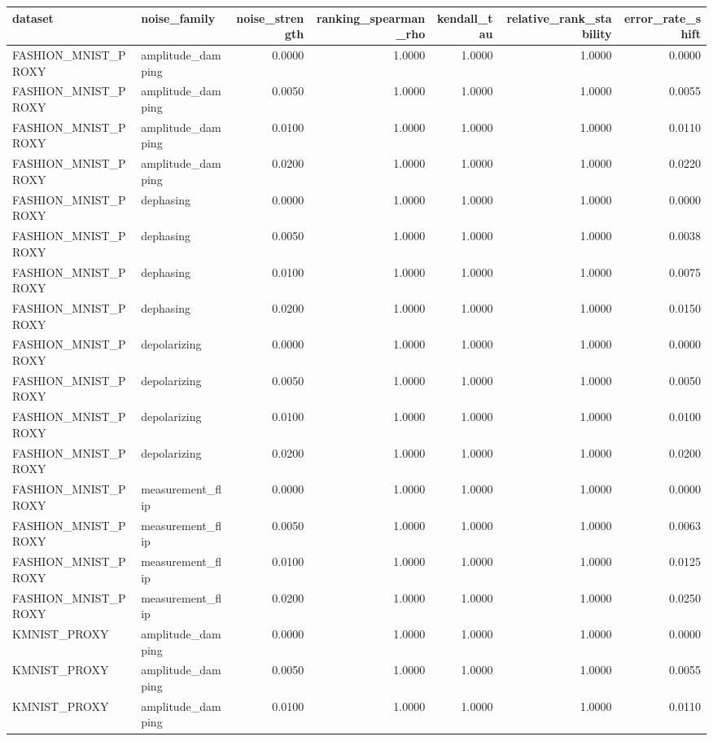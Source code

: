 \begin{tabular}{llrrrrr}
\toprule
dataset & noise\_family & noise\_strength & ranking\_spearman\_rho & kendall\_tau & relative\_rank\_stability & error\_rate\_shift \\
\midrule
FASHION\_MNIST\_PROXY & amplitude\_damping & 0.0000 & 1.0000 & 1.0000 & 1.0000 & 0.0000 \\
FASHION\_MNIST\_PROXY & amplitude\_damping & 0.0050 & 1.0000 & 1.0000 & 1.0000 & 0.0055 \\
FASHION\_MNIST\_PROXY & amplitude\_damping & 0.0100 & 1.0000 & 1.0000 & 1.0000 & 0.0110 \\
FASHION\_MNIST\_PROXY & amplitude\_damping & 0.0200 & 1.0000 & 1.0000 & 1.0000 & 0.0220 \\
FASHION\_MNIST\_PROXY & dephasing & 0.0000 & 1.0000 & 1.0000 & 1.0000 & 0.0000 \\
FASHION\_MNIST\_PROXY & dephasing & 0.0050 & 1.0000 & 1.0000 & 1.0000 & 0.0038 \\
FASHION\_MNIST\_PROXY & dephasing & 0.0100 & 1.0000 & 1.0000 & 1.0000 & 0.0075 \\
FASHION\_MNIST\_PROXY & dephasing & 0.0200 & 1.0000 & 1.0000 & 1.0000 & 0.0150 \\
FASHION\_MNIST\_PROXY & depolarizing & 0.0000 & 1.0000 & 1.0000 & 1.0000 & 0.0000 \\
FASHION\_MNIST\_PROXY & depolarizing & 0.0050 & 1.0000 & 1.0000 & 1.0000 & 0.0050 \\
FASHION\_MNIST\_PROXY & depolarizing & 0.0100 & 1.0000 & 1.0000 & 1.0000 & 0.0100 \\
FASHION\_MNIST\_PROXY & depolarizing & 0.0200 & 1.0000 & 1.0000 & 1.0000 & 0.0200 \\
FASHION\_MNIST\_PROXY & measurement\_flip & 0.0000 & 1.0000 & 1.0000 & 1.0000 & 0.0000 \\
FASHION\_MNIST\_PROXY & measurement\_flip & 0.0050 & 1.0000 & 1.0000 & 1.0000 & 0.0063 \\
FASHION\_MNIST\_PROXY & measurement\_flip & 0.0100 & 1.0000 & 1.0000 & 1.0000 & 0.0125 \\
FASHION\_MNIST\_PROXY & measurement\_flip & 0.0200 & 1.0000 & 1.0000 & 1.0000 & 0.0250 \\
KMNIST\_PROXY & amplitude\_damping & 0.0000 & 1.0000 & 1.0000 & 1.0000 & 0.0000 \\
KMNIST\_PROXY & amplitude\_damping & 0.0050 & 1.0000 & 1.0000 & 1.0000 & 0.0055 \\
KMNIST\_PROXY & amplitude\_damping & 0.0100 & 1.0000 & 1.0000 & 1.0000 & 0.0110 \\

\end{tabular}
